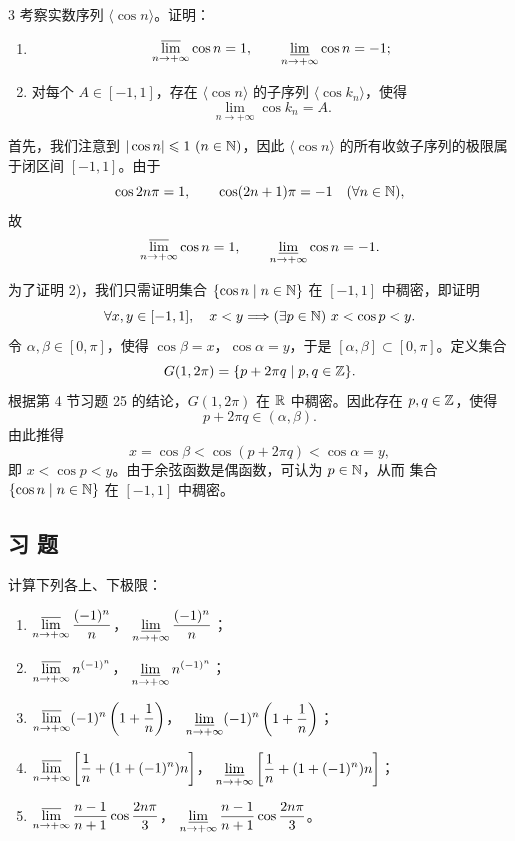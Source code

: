 \begin{sourceexample}{3}
考察实数序列 \(\langle\cos n\rangle\)。证明：
\begin{enumerate}[label=\arabic*)]
  \item
\[
\varlimsup_{n\to+\infty}\cos n=1,\qquad
\varliminf_{n\to+\infty}\cos n=-1;
\]
  \item 对每个 \(A\in[-1,1]\)，存在 \(\langle\cos n\rangle\) 的子序列
  \(\langle\cos k_n\rangle\)，使得
  \[
  \lim_{n\to+\infty}\cos k_n=A.
  \]
\end{enumerate}

首先，我们注意到 \(|\cos n|\leqslant1\ (n\in\N)\)，因此
\(\langle\cos n\rangle\) 的所有收敛子序列的极限属于闭区间
\([-1,1]\)。由于
\[
\cos 2n\pi=1,\qquad \cos(2n+1)\pi=-1
\quad(\forall n\in\mathbb{N}),
\]
故
\[
\varlimsup_{n\to+\infty}\cos n=1,\qquad
\varliminf_{n\to+\infty}\cos n=-1.
\]

为了证明 2)，我们只需证明集合
\(\{\cos n\mid n\in\mathbb{N}\}\) 在 \([-1,1]\) 中稠密，即证明
\[
\forall x,y\in[-1,1],\quad x<y
\Longrightarrow (\exists p\in\mathbb{N})\ x<\cos p<y.
\]
令 \(\alpha,\beta\in[0,\pi]\)，使得
\(\cos\beta=x\)，\(\cos\alpha=y\)，于是
\([\alpha,\beta]\subset[0,\pi]\)。定义集合
\[
G(1,2\pi)=\{p+2\pi q\mid p,q\in\mathbb{Z}\}.
\]
根据第 4 节习题 25 的结论，\(G(1,2\pi)\) 在 \(\mathbb{R}\) 中稠密。因此存在
\(p,q\in\mathbb{Z}\)，使得
\[
p+2\pi q\in(\alpha,\beta).
\]
由此推得
\[
x=\cos\beta<\cos(p+2\pi q)<\cos\alpha=y,
\]
即 \(x<\cos p<y\)。由于余弦函数是偶函数，可认为 \(p\in\mathbb{N}\)，从而
集合 \(\{\cos n\mid n\in\mathbb{N}\}\) 在 \([-1,1]\) 中稠密。
\end{sourceexample}

\subsection*{习 题}

\begin{exercise}
\item 计算下列各上、下极限：
\begin{enumerate}[label=\arabic*)]
  \item \(\displaystyle\varlimsup_{n\to+\infty}\frac{(-1)^n}{n}\)，
  \(\displaystyle\varliminf_{n\to+\infty}\frac{(-1)^n}{n}\)；
  \item \(\displaystyle\varlimsup_{n\to+\infty}n^{(-1)^n}\)，
  \(\displaystyle\varliminf_{n\to+\infty}n^{(-1)^n}\)；
  \item \(\displaystyle\varlimsup_{n\to+\infty}(-1)^n\left(1+\frac1n\right)\)，
  \(\displaystyle\varliminf_{n\to+\infty}(-1)^n\left(1+\frac1n\right)\)；
  \item \(\displaystyle\varlimsup_{n\to+\infty}\left[\frac1n+(1+(-1)^n)n\right]\)，
  \(\displaystyle\varliminf_{n\to+\infty}\left[\frac1n+(1+(-1)^n)n\right]\)；
  \item \(\displaystyle\varlimsup_{n\to+\infty}\frac{n-1}{n+1}\cos\frac{2n\pi}{3}\)，
  \(\displaystyle\varliminf_{n\to+\infty}\frac{n-1}{n+1}\cos\frac{2n\pi}{3}\)。
\end{enumerate}
\end{exercise}

